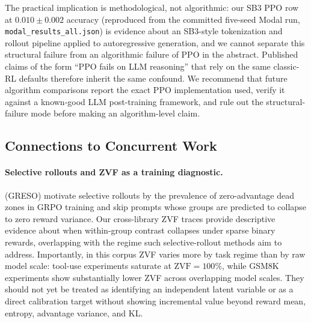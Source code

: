 \documentclass{article}
\begin{document}
The practical implication is methodological, not algorithmic: our
SB3 PPO row at $0.010 \pm 0.002$ accuracy (reproduced from the committed
five-seed Modal run, \texttt{modal\_results\_all.json}) is evidence about an
SB3-style tokenization and rollout pipeline applied to
autoregressive generation, and we cannot separate this structural
failure from an algorithmic failure of PPO in the abstract.
Published claims of the form ``PPO fails on LLM reasoning'' that
rely on the same classic-RL defaults therefore inherit the same
confound. We recommend that future algorithm comparisons report the
exact PPO implementation used, verify it against a known-good
LLM post-training framework, and rule out the structural-failure
mode before making an algorithm-level claim.

\subsection{Connections to Concurrent Work}
\label{sec:discuss_related}

\paragraph{Selective rollouts and ZVF as a training diagnostic.}
\citet{zhang2026greso} (GRESO) motivate selective rollouts by the prevalence of
zero-advantage dead zones in GRPO training and skip prompts whose groups are
predicted to collapse to zero reward variance.
Our cross-library ZVF traces provide descriptive evidence about when
within-group contrast collapses under sparse binary rewards, overlapping with
the regime such selective-rollout methods aim to address.
Importantly, in this corpus ZVF varies more by task regime than by raw model
scale: tool-use experiments saturate at $\text{ZVF} = 100\%$, while GSM8K
experiments show substantially lower ZVF across overlapping model scales.
They should not yet be treated as identifying an independent latent variable
or as a direct calibration target without showing incremental value beyond
reward mean, entropy, advantage variance, and KL.
\end{document}
